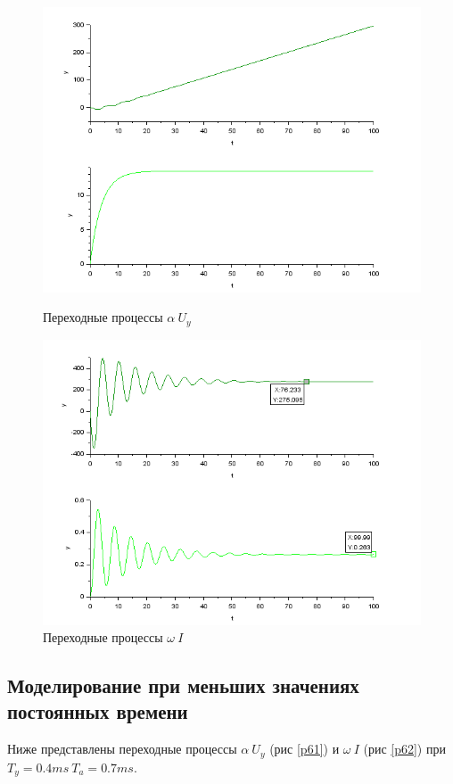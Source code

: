 \documentclass[a4paper,12pt,russian]{article} %
\begin{document}
\begin{figure}[H]
	\includegraphics[width=\linewidth]{541.png}
	\caption{Переходные процессы $\alpha\:  U_y$}\label{p541}
	\endminipage\hfill
	\includegraphics[width=\linewidth]{542.png}
	\caption{Переходные процессы $\omega\:  I$}\label{p542}
	\endminipage
\end{figure}

\subsection{Моделирование при меньших значениях постоянных времени}
Ниже представлены переходные процессы  $\alpha\:  U_y$ (рис \ref{p61}) и $\omega\:  I$ (рис \ref{p62})  при  $T_y=0.4ms\: T_a=0.7ms$.
\end{document}
